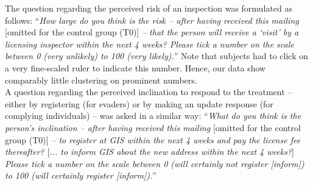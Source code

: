 \documentclass[preprint,inputenc=ansinew,doublespace,notheorems,wider]{jeea}
\begin{document}
The question regarding the perceived risk of an inspection was formulated as follows: \normalsize{``\textit{How large do you think is the risk -- after having received this mailing} [omitted for the control group (T0)] \textit{-- that the person will receive a `visit' by a licensing inspector within the next 4 weeks? Please tick a number on the scale between 0 (very unlikely) to 100 (very likely).}''} Note that subjects had to click on a very fine-scaled ruler to indicate this number. Hence, our data show comparably little clustering on prominent numbers.\smallskip \\
%
\normalsize{A question regarding the perceived inclination to respond to the treatment -- either by registering (for evaders) or by making an update response (for complying individuals) -- was asked in a similar way:} \normalsize{``\textit{What do you think is the person's inclination -- after having received this mailing} [omitted for the control group (T0)] \textit{-- to register at GIS within the next 4 weeks and pay the license fee thereafter?} [\textit{... to inform GIS about the new address within the next 4 weeks?}] \textit{Please tick a number on the scale between 0 (will certainly not register [inform]) to 100 (will certainly register [inform]).}''}\smallskip \\
%
\end{document}
